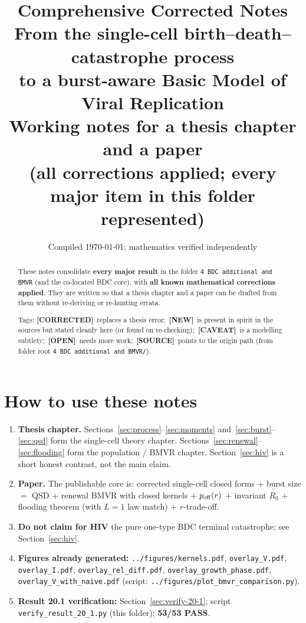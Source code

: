 \documentclass[11pt,a4paper]{article}
\title{\textbf{Comprehensive Corrected Notes}\\[0.35em]
\large From the single-cell birth--death--catastrophe process\\
to a burst-aware Basic Model of Viral Replication\\[0.4em]
\normalsize Working notes for a thesis chapter and a paper\\
(all corrections applied; every major item in this folder represented)}
\author{}
\date{Compiled \today; mathematics verified independently}
\theoremstyle{plain}
\theoremstyle{definition}
\theoremstyle{remark}
\newcommand{\COR}{\textcolor{green!40!black}{\textbf{[CORRECTED]}}}
\newcommand{\NEW}{\textcolor{blue!55!black}{\textbf{[NEW]}}}
\newcommand{\CAVEAT}{\textcolor{orange!70!black}{\textbf{[CAVEAT]}}}
\newcommand{\OPEN}{\textcolor{red!55!black}{\textbf{[OPEN]}}}
\newcommand{\SOURCE}{\textcolor{gray!50!black}{\textbf{[SOURCE]}}}
\begin{document}
\maketitle
\vspace{-1.2em}

\begin{abstract}
\noindent
These notes consolidate \textbf{every major result} in the folder
\texttt{4 BDC additional and BMVR} (and the co-located BDC core), with
\textbf{all known mathematical corrections applied}. They are written so that
a thesis chapter and a paper can be drafted from them without re-deriving or
re-hunting errata.

Tags: \COR\ replaces a thesis error;\ \NEW\ is present in spirit in the sources
but stated cleanly here (or found on re-checking);\ \CAVEAT\ is a modelling
subtlety;\ \OPEN\ needs more work;\ \SOURCE\ points to the origin path
(from folder root \texttt{4 BDC additional and BMVR/}).
\end{abstract}

\tableofcontents
\clearpage

\section{How to use these notes}

\begin{enumerate}
\item \textbf{Thesis chapter.} Sections~\ref{sec:process}--\ref{sec:moments}
and~\ref{sec:burst}--\ref{sec:qsd} form the single-cell theory chapter.
Sections~\ref{sec:renewal}--\ref{sec:flooding} form the population / BMVR
chapter. Section~\ref{sec:hiv} is a short honest contrast, not the main claim.
\item \textbf{Paper.} The publishable core is: corrected single-cell closed forms
+ burst size $=$ QSD + renewal BMVR with closed kernels + $p_{\rm eff}(r)$ +
invariant $R_0$ + flooding theorem (with $L=1$ law match) + $r$-trade-off.
\item \textbf{Do not claim for HIV} the pure one-type BDC terminal catastrophe;
see Section~\ref{sec:hiv}.
\item \textbf{Figures already generated:}
\texttt{../figures/kernels.pdf},
\texttt{overlay\_V.pdf}, \texttt{overlay\_I.pdf}, \texttt{overlay\_rel\_diff.pdf},
\texttt{overlay\_growth\_phase.pdf}, \texttt{overlay\_V\_with\_naive.pdf}
(script: \texttt{../figures/plot\_bmvr\_comparison.py}).
\item \textbf{Result 20.1 verification:} Section~\ref{sec:verify-20-1};
script \texttt{verify\_result\_20\_1.py} (this folder); \textbf{53/53 PASS}.
\end{enumerate}
\end{document}
